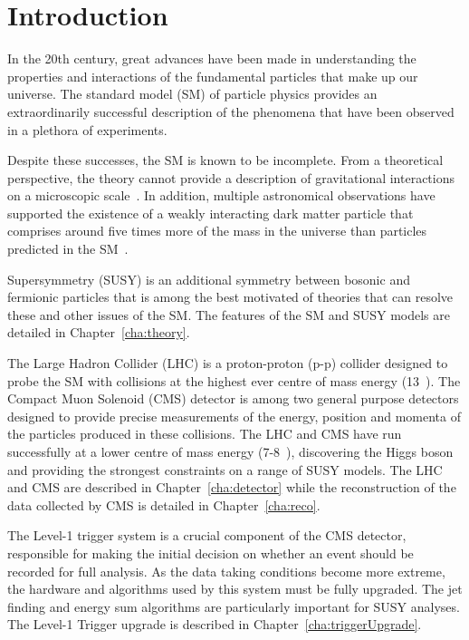 \chapter{Introduction}
\label{cha:introduction}

In the 20th century, great advances have been made in
understanding the properties and interactions of 
the fundamental particles that make up our universe. 
The standard model (SM) of particle physics provides an 
extraordinarily successful description of the phenomena 
that have been observed in a plethora of experiments.

Despite these successes, the SM is known to be incomplete.
From a theoretical perspective, the theory cannot provide a description of gravitational
interactions on a microscopic scale~\cite{gravRenorm}. In addition, multiple astronomical observations 
have supported the existence of a weakly interacting dark matter particle that
comprises around five times more of the mass in the universe than particles 
predicted in the SM~\cite{WIMP}.

Supersymmetry (SUSY) is an additional symmetry between bosonic and fermionic particles 
that is among the best motivated of theories that can resolve these
and other issues of the SM. The features of the SM and SUSY models are detailed 
in Chapter~\ref{cha:theory}. 

The Large Hadron Collider (LHC) is a proton-proton (p-p) collider designed to probe the 
SM with collisions at the highest ever centre of mass energy (13~\TeV).
The Compact Muon Solenoid (CMS) detector is among two general purpose detectors
designed to provide precise measurements of the energy, position and momenta of
the particles produced in these collisions. The LHC and CMS have run successfully at a lower centre of 
mass energy (7-8~\TeV), discovering the Higgs boson and providing the strongest 
constraints on a range of SUSY models. The LHC and CMS are described in Chapter~\ref{cha:detector}
while the reconstruction of the data collected by CMS is detailed in Chapter~\ref{cha:reco}.

The Level-1 trigger system is a crucial component of the CMS detector, responsible 
for making the initial decision on whether an event should be recorded 
for full analysis. As the data taking conditions become more extreme, the hardware
and algorithms used by this system must be fully upgraded. The jet finding and energy sum algorithms 
are particularly important for SUSY analyses. The Level-1 Trigger upgrade is described in 
Chapter~\ref{cha:triggerUpgrade}. 

